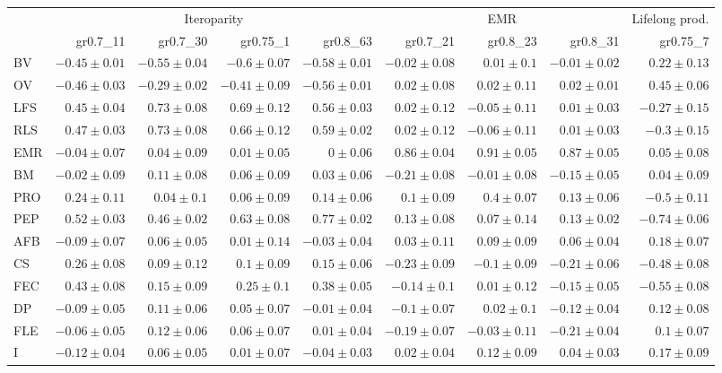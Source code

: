 \begin{landscape}
\begin{table}
\begin{footnotesize}
\begin{tabular}{@{}l|rrrr|rrr|r@{}}
\toprule
 & \multicolumn{4}{c|}{Iteroparity} & \multicolumn{3}{c|}{EMR} & \multicolumn{1}{c}{Lifelong prod.}\\
 & gr0.7\_11 & gr0.7\_30 & gr0.75\_1 & gr0.8\_63 & gr0.7\_21 & gr0.8\_23 & gr0.8\_31 & gr0.75\_7\\
\midrule
BV & $-0.45 \pm 0.01$ & $-0.55 \pm 0.04$ & $-0.6 \pm 0.07$ & $-0.58 \pm 0.01$ & $-0.02 \pm 0.08$ & $0.01 \pm 0.1$ & $-0.01 \pm 0.02$ & $0.22 \pm 0.13$\\
OV & $-0.46 \pm 0.03$ & $-0.29 \pm 0.02$ & $-0.41 \pm 0.09$ & $-0.56 \pm 0.01$ & $0.02 \pm 0.08$ & $0.02 \pm 0.11$ & $0.02 \pm 0.01$ & $0.45 \pm 0.06$\\
LFS & $0.45 \pm 0.04$ & $0.73 \pm 0.08$ & $0.69 \pm 0.12$ & $0.56 \pm 0.03$ & $0.02 \pm 0.12$ & $-0.05 \pm 0.11$ & $0.01 \pm 0.03$ & $-0.27 \pm 0.15$\\
RLS & $0.47 \pm 0.03$ & $0.73 \pm 0.08$ & $0.66 \pm 0.12$ & $0.59 \pm 0.02$ & $0.02 \pm 0.12$ & $-0.06 \pm 0.11$ & $0.01 \pm 0.03$ & $-0.3 \pm 0.15$\\
EMR & $-0.04 \pm 0.07$ & $0.04 \pm 0.09$ & $0.01 \pm 0.05$ & $0 \pm 0.06$ & $0.86 \pm 0.04$ & $0.91 \pm 0.05$ & $0.87 \pm 0.05$ & $0.05 \pm 0.08$\\
BM & $-0.02 \pm 0.09$ & $0.11 \pm 0.08$ & $0.06 \pm 0.09$ & $0.03 \pm 0.06$ & $-0.21 \pm 0.08$ & $-0.01 \pm 0.08$ & $-0.15 \pm 0.05$ & $0.04 \pm 0.09$\\
PRO & $0.24 \pm 0.11$ & $0.04 \pm 0.1$ & $0.06 \pm 0.09$ & $0.14 \pm 0.06$ & $0.1 \pm 0.09$ & $0.4 \pm 0.07$ & $0.13 \pm 0.06$ & $-0.5 \pm 0.11$\\
PEP & $0.52 \pm 0.03$ & $0.46 \pm 0.02$ & $0.63 \pm 0.08$ & $0.77 \pm 0.02$ & $0.13 \pm 0.08$ & $0.07 \pm 0.14$ & $0.13 \pm 0.02$ & $-0.74 \pm 0.06$\\
AFB & $-0.09 \pm 0.07$ & $0.06 \pm 0.05$ & $0.01 \pm 0.14$ & $-0.03 \pm 0.04$ & $0.03 \pm 0.11$ & $0.09 \pm 0.09$ & $0.06 \pm 0.04$ & $0.18 \pm 0.07$\\
CS & $0.26 \pm 0.08$ & $0.09 \pm 0.12$ & $0.1 \pm 0.09$ & $0.15 \pm 0.06$ & $-0.23 \pm 0.09$ & $-0.1 \pm 0.09$ & $-0.21 \pm 0.06$ & $-0.48 \pm 0.08$\\
FEC & $0.43 \pm 0.08$ & $0.15 \pm 0.09$ & $0.25 \pm 0.1$ & $0.38 \pm 0.05$ & $-0.14 \pm 0.1$ & $0.01 \pm 0.12$ & $-0.15 \pm 0.05$ & $-0.55 \pm 0.08$\\
DP & $-0.09 \pm 0.05$ & $0.11 \pm 0.06$ & $0.05 \pm 0.07$ & $-0.01 \pm 0.04$ & $-0.1 \pm 0.07$ & $0.02 \pm 0.1$ & $-0.12 \pm 0.04$ & $0.12 \pm 0.08$\\
FLE & $-0.06 \pm 0.05$ & $0.12 \pm 0.06$ & $0.06 \pm 0.07$ & $0.01 \pm 0.04$ & $-0.19 \pm 0.07$ & $-0.03 \pm 0.11$ & $-0.21 \pm 0.04$ & $0.1 \pm 0.07$\\
I & $-0.12 \pm 0.04$ & $0.06 \pm 0.05$ & $0.01 \pm 0.07$ & $-0.04 \pm 0.03$ & $0.02 \pm 0.04$ & $0.12 \pm 0.09$ & $0.04 \pm 0.03$ & $0.17 \pm 0.09$\\
\bottomrule
\end{tabular}


\end{footnotesize}
\end{table}
\end{landscape}
